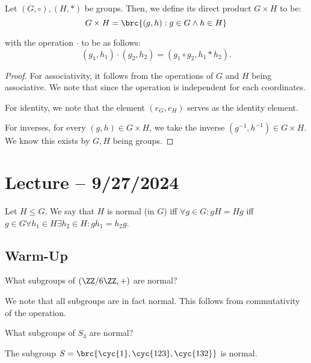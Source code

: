 \documentclass[openany]{book}
\begin{document}
\begin{defn}
	Let $(G, \circ), (H, *)$ be groups. Then, we define its direct product $G \times H$ to be:
	\begin{equation*}
		G \times H = \brc{(g, h) : g \in G \land h \in H}
	\end{equation*}

	with the operation $\cdot$ to be as follows:
	\begin{equation*}
		(g_1, h_1) \cdot (g_2, h_2) = (g_1 \circ g_2, h_1 * h_2).
	\end{equation*}
\end{defn}
\begin{proof}
	For associativity, it follows from the operations of $G$ and $H$ being associative. We note that since the operation is independent for each coordinates.
	
	For identity, we note that the element $(e_G, e_H)$ serves as the identity element.
	
	For inverses, for every $(g, h) \in G \times H$, we take the inverse $(g^{-1}, h^{-1}) \in G \times H$. We know this exists by $G, H$ being groups.
\end{proof}

\section{Lecture -- 9/27/2024}
\begin{defn}
	Let $H \leq G$. We say that $H$ is normal (in $G$) iff $\forall g \in G : g H = H g$ iff $g \in G \forall h_1 \in H \exists h_2 \in H : gh_1 = h_2 g$.
\end{defn}

\subsection{Warm-Up}
\begin{hw}
	What subgroups of $(\ZZ/6\ZZ, +)$ are normal?
\end{hw}
\begin{solution}
	We note that all subgroups are in fact normal. This follows from commutativity of the operation.
\end{solution}

\begin{hw}
	What subgroups of $S_3$ are normal?
\end{hw}
\begin{solution}
	The subgroup $S = \brc{\cyc{1}, \cyc{1 2 3}, \cyc{1 3 2}}$ is normal.
\end{solution}
\end{document}
